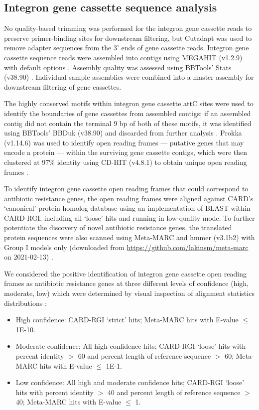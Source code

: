\subsection{Integron gene cassette sequence analysis} \label{section:cassette-sequence-analysis}

No quality-based trimming was performed for the integron gene cassette reads to preserve primer-binding sites for downstream filtering, but Cutadapt was used to remove adapter sequences from the 3’ ends of gene cassette reads.
Integron gene cassette sequence reads were assembled into contigs using MEGAHIT (v1.2.9) with default options \parencite{Li.2015c}.
Assembly quality was assessed using BBTools’ Stats (v38.90) \parencite{Bushnell.2016}.
Individual sample assemblies were combined into a master assembly for downstream filtering of gene cassettes.

The highly conserved motifs within integron gene cassette attC sites were used to identify the boundaries of gene cassettes from assembled contigs; if an assembled contig did not contain the terminal 9 bp of both of these motifs, it was identified using BBTools’ BBDuk (v38.90) and discarded from further analysis \parencite{Bushnell.2016}.
Prokka (v1.14.6) was used to identify open reading frames --- putative genes that may encode a protein --- within the surviving gene cassette contigs, which were then clustered at 97\% identity using CD-HIT (v4.8.1) to obtain unique open reading frames \parencite{Seemann.2014, Fu.2012}.

To identify integron gene cassette open reading frames that could correspond to antibiotic resistance genes, the open reading frames were aligned against CARD’s ‘canonical’ protein homolog database using an implementation of BLAST within CARD-RGI, including all ‘loose’ hits and running in low-quality mode.
To further potentiate the discovery of novel antibiotic resistance genes, the translated protein sequences were also scanned using Meta-MARC and hmmer (v3.1b2) with Group I models only (downloaded from \url{https://github.com/lakinsm/meta-marc} on 2021-02-13) \parencite{Lakin.2019, Wheeler.2013}.

We considered the positive identification of integron gene cassette open reading frames as antibiotic resistance genes at three different levels of confidence (high, moderate, low) which were determined by visual inspection of alignment statistics distributions \dummysupfig:

\begin{itemize}
	\item{High confidence: CARD-RGI ‘strict’ hits; Meta-MARC hits with E-value $\leq$ 1E-10.}
	\item{Moderate confidence: All high confidence hits; CARD-RGI ‘loose’ hits with percent identity $>$ 60 and percent length of reference sequence $>$ 60; Meta-MARC hits with E-value $\leq$ 1E-1.}
	\item{Low confidence: All high and moderate confidence hits; CARD-RGI ‘loose’ hits with percent identity $>$ 40 and percent length of reference sequence $>$ 40; Meta-MARC hits with E-value $\leq$ 1.}
\end{itemize}

